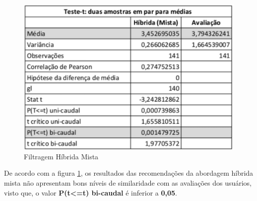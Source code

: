 \begin{figure}[H]
	\centering
	\includegraphics[width=.6\linewidth]{imagens/findmusicTesteTMista.jpg}
	\caption[Teste T: Filtragem Híbrida Mista]{Filtragem Híbrida Mista}
    \label{fig:findMusicTesteTMista}
\end{figure}

De acordo com a figura \ref{fig:findMusicTesteTMista}, os resultados das recomendações da abordagem híbrida mista não apresentam bons níveis de similaridade com as avaliações dos usuários, visto que, o valor \textbf{P(t<=t) bi-caudal} é inferior a \textbf{0,05}.